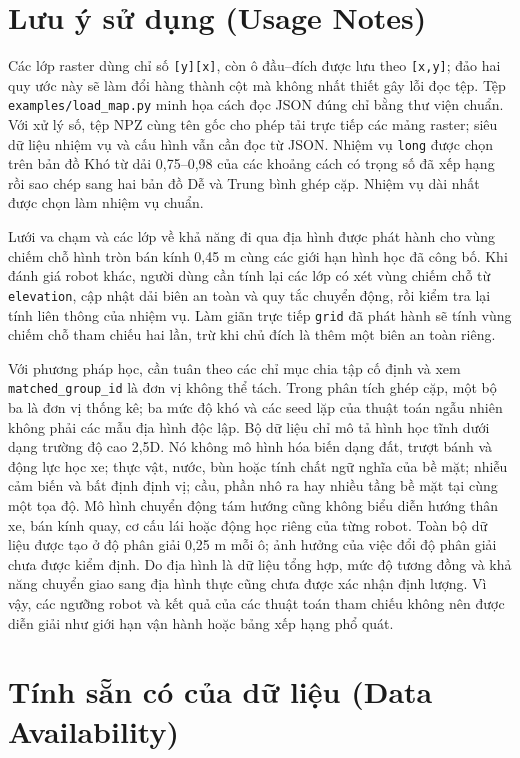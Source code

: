 \documentclass[11pt]{article}
\begin{document}
\section{Lưu ý sử dụng (Usage Notes)}

Các lớp raster dùng chỉ số \texttt{[y][x]}, còn ô đầu--đích được lưu theo
\texttt{[x,y]}; đảo hai quy ước này sẽ làm đổi hàng thành cột mà không nhất thiết
gây lỗi đọc tệp. Tệp \texttt{examples/load\_map.py} minh họa cách đọc JSON đúng
chỉ bằng thư viện chuẩn. Với xử lý số,
tệp NPZ cùng tên gốc cho phép tải trực tiếp các mảng raster; siêu dữ liệu nhiệm vụ và
cấu hình vẫn cần đọc từ JSON. Nhiệm vụ
\texttt{long} được chọn trên bản đồ Khó từ dải 0,75--0,98 của các khoảng
cách có trọng số đã xếp hạng rồi sao chép sang hai bản đồ Dễ và Trung bình ghép
cặp. Nhiệm vụ dài nhất được chọn làm nhiệm vụ chuẩn.

Lưới va chạm và các lớp về khả năng đi qua địa hình được phát hành cho vùng chiếm chỗ hình tròn
bán kính 0,45 m cùng các giới hạn hình học đã công bố. Khi đánh giá robot khác,
người dùng cần tính lại các lớp có xét vùng chiếm chỗ từ \texttt{elevation}, cập nhật
dải biên an toàn và quy tắc chuyển động, rồi kiểm tra lại tính liên thông của
nhiệm vụ. Làm giãn trực tiếp \texttt{grid} đã phát hành sẽ tính vùng chiếm chỗ tham
chiếu hai lần, trừ khi chủ đích là thêm một biên an toàn riêng.

Với phương pháp học, cần tuân theo các chỉ mục chia tập cố định và xem
\texttt{matched\_group\_id} là đơn vị không thể tách. Trong phân tích ghép cặp,
một bộ ba là đơn vị thống kê; ba mức độ khó và các seed lặp của thuật toán ngẫu
nhiên không phải các mẫu địa hình độc lập. Bộ dữ liệu chỉ mô tả hình học tĩnh
dưới dạng trường độ cao 2,5D. Nó không mô hình hóa biến dạng đất, trượt bánh và
động lực học xe; thực vật, nước, bùn hoặc tính chất ngữ nghĩa của bề mặt; nhiễu
cảm biến và bất định định vị; cầu, phần nhô ra hay nhiều tầng bề mặt tại cùng
một tọa độ. Mô hình chuyển động tám hướng cũng không biểu diễn hướng thân xe,
bán kính quay, cơ cấu lái hoặc động học riêng của từng robot. Toàn bộ dữ liệu
được tạo ở độ phân giải 0,25 m mỗi ô; ảnh hưởng của việc đổi độ phân giải chưa
được kiểm định. Do địa hình là dữ liệu tổng hợp, mức độ tương đồng và khả năng
chuyển giao sang địa hình thực cũng chưa được xác nhận định lượng. Vì vậy, các
ngưỡng robot và kết quả của các thuật toán tham chiếu không nên được diễn giải như giới hạn
vận hành hoặc bảng xếp hạng phổ quát.

\section{Tính sẵn có của dữ liệu (Data Availability)}
\end{document}
